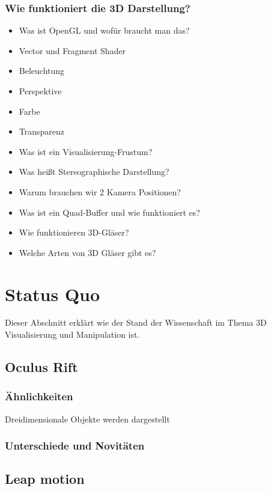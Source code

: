 \documentclass[12pt]{extarticle}
\begin{document}

\subsubsection*{Wie funktioniert die 3D Darstellung?}
	\begin{itemize}
	\item Was ist OpenGL und wofür braucht man das?
	\item Vector und Fragment Shader
	\item Beleuchtung
	\item Perspektive
	\item Farbe
	\item Transparenz
	\item Was ist ein Visualisierung-Frustum?
	\item Was heißt  Stereographische Darstellung?
	\item Warum brauchen wir 2 Kamera Positionen?
	\item Was ist ein Quad-Buffer und wie funktioniert es?
	\item Wie funktionieren 3D-Gläser?
	\item Welche Arten von 3D Gläser gibt es? 
	\end{itemize}



\section{Status Quo}
Dieser Abschnitt erklärt wie der Stand der Wissenschaft im Thema 3D Visualisierung und Manipulation ist.
\subsection{Oculus Rift}
\subsubsection{Ähnlichkeiten}
Dreidimensionale Objekte werden dargestellt
\subsubsection{Unterschiede und Novitäten}
\subsection{Leap motion}
\end{document}

